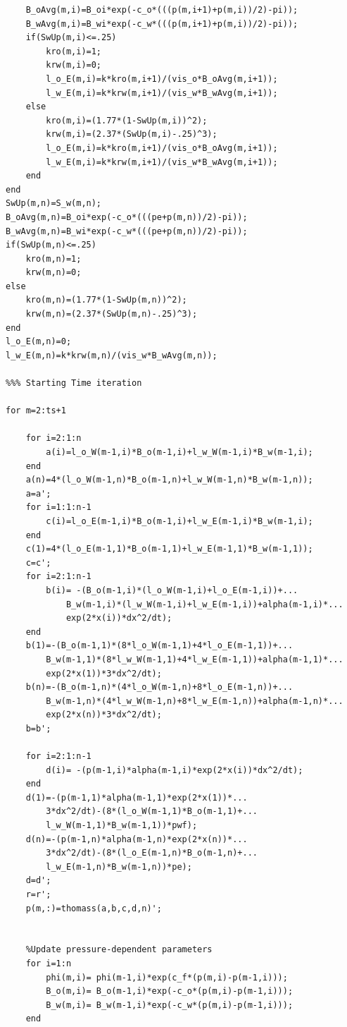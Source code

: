 \documentclass[12pt,letterpaper,titlepage]{article}
\begin{document}
\begin{verbatim}
    B_oAvg(m,i)=B_oi*exp(-c_o*(((p(m,i+1)+p(m,i))/2)-pi));
    B_wAvg(m,i)=B_wi*exp(-c_w*(((p(m,i+1)+p(m,i))/2)-pi));
    if(SwUp(m,i)<=.25)
        kro(m,i)=1;
        krw(m,i)=0;
        l_o_E(m,i)=k*kro(m,i+1)/(vis_o*B_oAvg(m,i+1));
        l_w_E(m,i)=k*krw(m,i+1)/(vis_w*B_wAvg(m,i+1));
    else
        kro(m,i)=(1.77*(1-SwUp(m,i))^2);
        krw(m,i)=(2.37*(SwUp(m,i)-.25)^3);
        l_o_E(m,i)=k*kro(m,i+1)/(vis_o*B_oAvg(m,i+1));
        l_w_E(m,i)=k*krw(m,i+1)/(vis_w*B_wAvg(m,i+1));
    end
end
SwUp(m,n)=S_w(m,n);
B_oAvg(m,n)=B_oi*exp(-c_o*(((pe+p(m,n))/2)-pi));
B_wAvg(m,n)=B_wi*exp(-c_w*(((pe+p(m,n))/2)-pi));
if(SwUp(m,n)<=.25)
    kro(m,n)=1;
    krw(m,n)=0;
else
    kro(m,n)=(1.77*(1-SwUp(m,n))^2);
    krw(m,n)=(2.37*(SwUp(m,n)-.25)^3);
end
l_o_E(m,n)=0;
l_w_E(m,n)=k*krw(m,n)/(vis_w*B_wAvg(m,n));

%%% Starting Time iteration

for m=2:ts+1
    
    for i=2:1:n
        a(i)=l_o_W(m-1,i)*B_o(m-1,i)+l_w_W(m-1,i)*B_w(m-1,i);
    end
    a(n)=4*(l_o_W(m-1,n)*B_o(m-1,n)+l_w_W(m-1,n)*B_w(m-1,n));
    a=a';
    for i=1:1:n-1
        c(i)=l_o_E(m-1,i)*B_o(m-1,i)+l_w_E(m-1,i)*B_w(m-1,i);
    end
    c(1)=4*(l_o_E(m-1,1)*B_o(m-1,1)+l_w_E(m-1,1)*B_w(m-1,1));
    c=c';
    for i=2:1:n-1
        b(i)= -(B_o(m-1,i)*(l_o_W(m-1,i)+l_o_E(m-1,i))+...
            B_w(m-1,i)*(l_w_W(m-1,i)+l_w_E(m-1,i))+alpha(m-1,i)*...
            exp(2*x(i))*dx^2/dt);
    end
    b(1)=-(B_o(m-1,1)*(8*l_o_W(m-1,1)+4*l_o_E(m-1,1))+...
        B_w(m-1,1)*(8*l_w_W(m-1,1)+4*l_w_E(m-1,1))+alpha(m-1,1)*...
        exp(2*x(1))*3*dx^2/dt);
    b(n)=-(B_o(m-1,n)*(4*l_o_W(m-1,n)+8*l_o_E(m-1,n))+...
        B_w(m-1,n)*(4*l_w_W(m-1,n)+8*l_w_E(m-1,n))+alpha(m-1,n)*...
        exp(2*x(n))*3*dx^2/dt);
    b=b';
    
    for i=2:1:n-1
        d(i)= -(p(m-1,i)*alpha(m-1,i)*exp(2*x(i))*dx^2/dt);
    end
    d(1)=-(p(m-1,1)*alpha(m-1,1)*exp(2*x(1))*...
        3*dx^2/dt)-(8*(l_o_W(m-1,1)*B_o(m-1,1)+...
        l_w_W(m-1,1)*B_w(m-1,1))*pwf);
    d(n)=-(p(m-1,n)*alpha(m-1,n)*exp(2*x(n))*...
        3*dx^2/dt)-(8*(l_o_E(m-1,n)*B_o(m-1,n)+...
        l_w_E(m-1,n)*B_w(m-1,n))*pe);
    d=d';
    r=r';
    p(m,:)=thomass(a,b,c,d,n)';
    
    
    %Update pressure-dependent parameters
    for i=1:n
        phi(m,i)= phi(m-1,i)*exp(c_f*(p(m,i)-p(m-1,i)));
        B_o(m,i)= B_o(m-1,i)*exp(-c_o*(p(m,i)-p(m-1,i)));
        B_w(m,i)= B_w(m-1,i)*exp(-c_w*(p(m,i)-p(m-1,i)));
    end
    

\end{verbatim}
\end{document}

